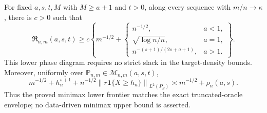 For fixed \(a,s,t,M\) with \(M\ge a+1\) and \(t>0\), along every sequence with \(m/n\to\kappa\), there is \(c>0\) such that
\[
\mathfrak R_{n,m}(a,s,t)\ge c\left\{m^{-1/2}+\begin{cases}
n^{-1/2},&a<1,\\
\sqrt{\log n/n},&a=1,\\
n^{-(s+1)/(2s+a+1)},&a>1.
\end{cases}\right\}.
\]
This lower phase diagram requires no strict slack in the target-density bounds. Moreover, uniformly over \(\mathbb P_{n,m}\in\mathcal M_{n,m}(a,s,t)\),
\[
m^{-1/2}+h_n^{s+1}+n^{-1/2}\left\|r\mathbf 1\{X\ge h_n\}\right\|_{L^2(P_S)}
\asymp m^{-1/2}+\rho_n(a,s).
\]
Thus the proved minimax lower frontier matches the exact truncated-oracle envelope; no data-driven minimax upper bound is asserted.